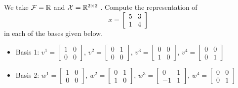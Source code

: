 \begin{example}

 We take $\mathcal{F}=\mathbb R$ and $\mathcal{X}=\mathbb R^{2\times2}$ . Compute the representation of 
  $$x=\left[\begin{array}{rr}
        5 & 3\\
        1 & 4
        \end{array}\right]$$
    in each of the bases given below.
   \begin{itemize}
   \setlength{\itemsep}{.3cm}
        \item[] Basis 1: $v^{1}=\left[\begin{array}{rr}
            1 & 0\\
            0 & 0
            \end{array}\right]$, $v^{2}=\left[\begin{array}{rr}
            0 & 1\\
            0 & 0
            \end{array}\right]$, $v^{3}=\left[\begin{array}{rr}
            0 & 0\\
            1 & 0
            \end{array}\right]$, $v^{4}=\left[\begin{array}{rr}
            0 & 0\\
            0 & 1
            \end{array}\right]$ 
            
        \item[] Basis 2: $w^{1}=\left[\begin{array}{rr}
            1 & 0\\
            0 & 0
            \end{array}\right]$, $w^{2}=\left[\begin{array}{rr}
            0 & 1\\
            1 & 0
            \end{array}\right]$, $w^{3}=\left[\begin{array}{rr}
            0 & 1\\
            -1 & 1
            \end{array}\right]$, $w^{4}=\left[\begin{array}{rr}
            0 & 0\\
            0 & 1
            \end{array}\right]$
    \end{itemize}
    \end{example}
    
